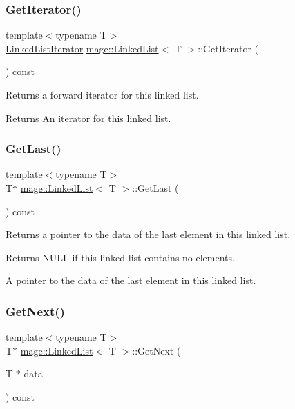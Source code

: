 \subsubsection{\texorpdfstring{Get\+Iterator()}{GetIterator()}}
{\footnotesize\ttfamily template$<$typename T$>$ \\
\hyperlink{structmage_1_1_linked_list_1_1_linked_list_iterator}{Linked\+List\+Iterator} \hyperlink{classmage_1_1_linked_list}{mage\+::\+Linked\+List}$<$ T $>$\+::Get\+Iterator (\begin{DoxyParamCaption}{ }\end{DoxyParamCaption}) const}

Returns a forward iterator for this linked list.

\begin{DoxyReturn}{Returns}
An iterator for this linked list. 
\end{DoxyReturn}
\hypertarget{classmage_1_1_linked_list_a734f6dc6d073edd99eb9a0ac1f605900}{}\label{classmage_1_1_linked_list_a734f6dc6d073edd99eb9a0ac1f605900} 
\subsubsection{\texorpdfstring{Get\+Last()}{GetLast()}}
{\footnotesize\ttfamily template$<$typename T$>$ \\
T$\ast$ \hyperlink{classmage_1_1_linked_list}{mage\+::\+Linked\+List}$<$ T $>$\+::Get\+Last (\begin{DoxyParamCaption}{ }\end{DoxyParamCaption}) const}

Returns a pointer to the data of the last element in this linked list.

\begin{DoxyReturn}{Returns}
{\ttfamily N\+U\+LL} if this linked list contains no elements. 

A pointer to the data of the last element in this linked list. 
\end{DoxyReturn}
\hypertarget{classmage_1_1_linked_list_a992390dbc48cf24705f9e79baef37061}{}\label{classmage_1_1_linked_list_a992390dbc48cf24705f9e79baef37061} 
\subsubsection{\texorpdfstring{Get\+Next()}{GetNext()}}
{\footnotesize\ttfamily template$<$typename T$>$ \\
T$\ast$ \hyperlink{classmage_1_1_linked_list}{mage\+::\+Linked\+List}$<$ T $>$\+::Get\+Next (\begin{DoxyParamCaption}\item[{T $\ast$}]{data }\end{DoxyParamCaption}) const}

